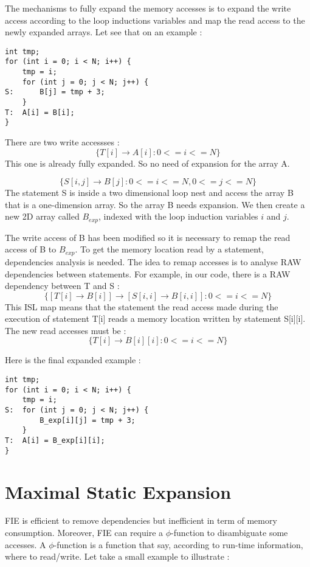 The mechanisms to fully expand the memory accesses is to expand the write access according to the loop inductions variables and map the read access to the newly expanded arrays. Let see that on an example :

\begin{lstlisting}[frame=single]
int tmp;
for (int i = 0; i < N; i++) {
    tmp = i;
    for (int j = 0; j < N; j++) {
S:      B[j] = tmp + 3;
    }
T:  A[i] = B[i];
}
\end{lstlisting}

There are two write accessses :
\[
\{T[i] \rightarrow A[i]:0<=i<=N\}
\]
This one is already fully expanded. So no need of expansion for the array A.

\[
\{S[i,j] \rightarrow B[j]:0<=i<=N,0<=j<=N\}
\]
The statement S is inside a two dimensional loop nest and access the array B that is a one-dimension array. So the array B needs expansion. We then create a new 2D array called $B_{exp}$, indexed with the loop induction variables $i$ and $j$.

The write access of B has been modified so it is necessary to remap the read access of B to $B_{exp}$. To get the memory location read by a statement, dependencies analysis is needed. The idea to remap accesses is to analyse \ac{RAW} dependencies between statements. For example, in our code, there is a \ac{RAW} dependency between T and S :
\[
\{[T[i] \rightarrow B[i]] \rightarrow [S[i,i] \rightarrow B[i,i]]:0<=i<=N\}
\]
This \ac{ISL} map means that the statement the read access made during the execution of statement T[i] reads a memory location written by statement S[i][i]. The new read accesses must be :
 \[
\{T[i] \rightarrow B[i][i]:0<=i<=N\}
\]

Here is the final expanded example :
\begin{lstlisting}[frame=single]
int tmp;
for (int i = 0; i < N; i++) {
    tmp = i;
S:  for (int j = 0; j < N; j++) {
        B_exp[i][j] = tmp + 3;
    }
T:  A[i] = B_exp[i][i];
}
\end{lstlisting}


\section{Maximal Static Expansion}
\ac{FIE} is efficient to remove dependencies but inefficient in term of memory consumption. Moreover, \ac{FIE} can require a $\phi$-function to disambiguate some accesses. A $\phi$-function is a function that say, according to run-time information, where to read/write. Let take a small example to illustrate :

